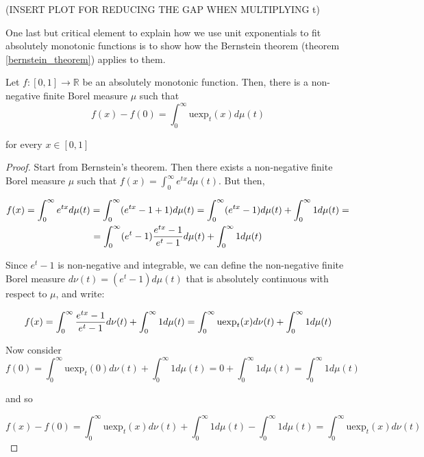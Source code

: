 \documentclass[12pt,a4paper]{article}
\newcommand{\realfunction}[2] {{#1: #2 \rightarrow \mathbb{R}}}
\newcommand{\uexp}[1] {{\text{uexp}_{#1}}}
\begin{document}
(INSERT PLOT FOR REDUCING THE GAP WHEN MULTIPLYING t)

One last but critical element to explain how we use unit exponentials to fit absolutely monotonic functions is to show how the Bernstein theorem (theorem \ref{bernstein_theorem}) applies to them.

\begin{theorem}
Let $\realfunction{f}{[0,1]}$ be an absolutely monotonic function. Then, there is a non-negative finite Borel measure $\mu$ such that
\begin{equation}
f(x) - f(0) = \int_{0}^{\infty} \uexp{t}(x) d \mu(t)
\end{equation}

\noindent for every $x \in [0,1]$
\end{theorem}

\begin{proof}
Start from Bernstein's theorem. Then there exists a non-negative finite Borel measure $\mu$ such that $f(x) = \int_{0}^{\infty} e^{tx} d \mu(t)$. But then,

\begin{multline}
f(x) = \int_{0}^{\infty} e^{tx} d \mu(t) = \int_{0}^{\infty} (e^{tx} - 1 + 1) d \mu(t) = \int_{0}^{\infty} (e^{tx} - 1) d \mu(t) + \int_{0}^{\infty} 1 d \mu(t) =\\
= \int_{0}^{\infty} (e^t - 1) {{e^{tx} - 1} \over {e^t - 1}} d \mu(t) + \int_{0}^{\infty} 1 d \mu(t)\\
\end{multline}

Since $e^t - 1$ is non-negative and integrable, we can define the non-negative finite Borel measure $d \nu(t) = (e^t - 1) d \mu(t)$ that is absolutely continuous with respect to $\mu$, and write:

\begin{equation}
f(x) =  \int_{0}^{\infty} {{e^{tx} - 1} \over {e^t - 1}} d \nu(t) + \int_{0}^{\infty} 1 d \mu(t) = \int_{0}^{\infty} \uexp{t}(x) d \nu(t) + \int_{0}^{\infty} 1 d \mu(t)
\end{equation}

Now consider 
\begin{equation}
f(0) =  \int_{0}^{\infty} \uexp{t}(0) d \nu(t) + \int_{0}^{\infty} 1 d \mu(t) = 0 + \int_{0}^{\infty} 1 d \mu(t) = \int_{0}^{\infty} 1 d \mu(t)
\end{equation}

\noindent and so

\begin{equation}
f(x) - f(0) = \int_{0}^{\infty} \uexp{t}(x) d \nu(t) + \int_{0}^{\infty} 1 d \mu(t) - \int_{0}^{\infty} 1 d \mu(t) = \int_{0}^{\infty} \uexp{t}(x) d \nu(t)
\end{equation}
\end{proof}
\end{document}
